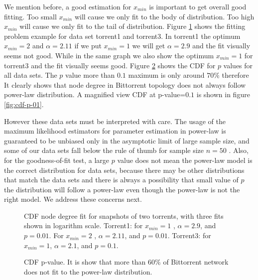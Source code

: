 \documentclass[10pt,conference,letterpaper]{IEEEtran}
\begin{document}
We mention before, a good estimation for $x_{min}$ is important to get overall good fitting.
Too small $x_{min}$ will cause we only fit to the body of distribution.
Too high $x_{min}$ will cause we only fit to the tail of distribution.
Figure \ref{fig:fitting} shows the fitting problem example for data set torrent1 and torrent3.
In torrent1 the optimum $x_{min}=2$ and $\alpha=2.11$ if we put $x_{min}=1$ we will get $\alpha=2.9$ and the fit visually seems not good.
While in the same graph we also show the optimum $x_{min}=1$ for torrent3 and the fit visually seems good.
Figure  \ref{fig:cdf-p} shows the CDF for $p$ values for all data sets. 
The $p$ value more than $0.1$ maximum is only around $70\%$ therefore It clearly shows that node degree in Bittorrent topology does not always follow power-law distribution.
A magnified view CDF at p-value=$0.1$ is  shown in figure \ref{fig:cdf-p-01}.

However these data sets must be interpreted with care. 
The usage of the maximum likelihood estimators for parameter estimation in power-law is guaranteed to be unbiased only in the asymptotic limit of large sample size, and some of our data sets fall below the rule of thumb for sample size $n=50$ \cite{clauset2009power}. 
Also, for the goodness-of-fit test, a large $p$ value does not mean the power-law model is the correct distribution for data sets, because there may be other distributions that match the data sets and there is always a possibility that small value of $p$ the distribution will follow a power-law even though the power-law is not the right model\cite{clauset2009power}. 
We address these concerns next.

\begin{figure}
\centering
{}
\caption{CDF node degree fit for snapshots of two torrents, with three fits shown in logarithm scale. Torrent1: for $x_{min}=1$ , $\alpha = 2.9$, and $p=0.01$. For $x_{min}=2$ , $\alpha = 2.11$, and $p = 0.01$. Torrent3: for $x_{min}=1$, $\alpha = 2.1$, and $p = 0.1$. }
\label{fig:fitting}
\end{figure}

\begin{figure}
\centering
\caption{CDF p-value. It is show that more than 60\% of Bittorrent network does not fit to the power-law distribution.} 
\label{fig:cdf-p}
\end{figure}
\end{document}
